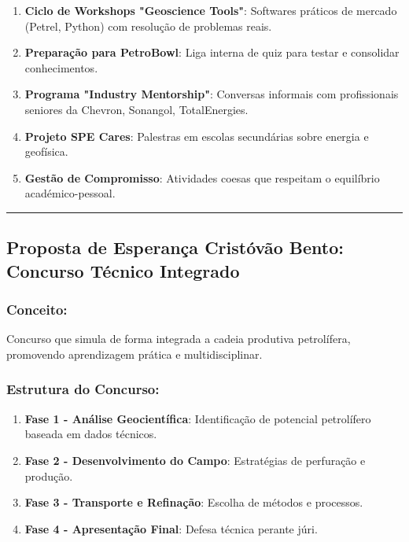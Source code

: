 \documentclass[12pt,a4paper]{article}
\begin{document}
\begin{enumerate}[itemsep=0.2cm]
    \item \textbf{Ciclo de Workshops "Geoscience Tools"}: Softwares práticos de mercado (Petrel, Python) com resolução de problemas reais.
    
    \item \textbf{Preparação para PetroBowl}: Liga interna de quiz para testar e consolidar conhecimentos.
    
    \item \textbf{Programa "Industry Mentorship"}: Conversas informais com profissionais seniores da Chevron, Sonangol, TotalEnergies.
    
    \item \textbf{Projeto SPE Cares}: Palestras em escolas secundárias sobre energia e geofísica.
    
    \item \textbf{Gestão de Compromisso}: Atividades coesas que respeitam o equilíbrio académico-pessoal.
\end{enumerate}

\textcolor{spe-secondary}{\hspace{0.5cm}\rule{0.4\linewidth}{0.8pt}}
\subsection{Proposta de Esperança Cristóvão Bento: Concurso Técnico Integrado}

\subsubsection*{Conceito:}
Concurso que simula de forma integrada a cadeia produtiva petrolífera, promovendo aprendizagem prática e multidisciplinar.

\subsubsection*{Estrutura do Concurso:}

\begin{enumerate}[itemsep=0.2cm]
    \item \textbf{Fase 1 - Análise Geocientífica}: Identificação de potencial petrolífero baseada em dados técnicos.
    
    \item \textbf{Fase 2 - Desenvolvimento do Campo}: Estratégias de perfuração e produção.
    
    \item \textbf{Fase 3 - Transporte e Refinação}: Escolha de métodos e processos.
    
    \item \textbf{Fase 4 - Apresentação Final}: Defesa técnica perante júri.
\end{enumerate}
\end{document}
